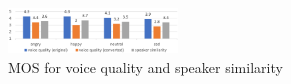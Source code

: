 \documentclass{article}
\begin{document}
\begin{figure}[htb]
\center
\includegraphics[width=0.4\textwidth]{FIG/MOS}
\caption{MOS for voice quality and speaker similarity}
\label{fig:mos}
\end{figure}
\end{document}
